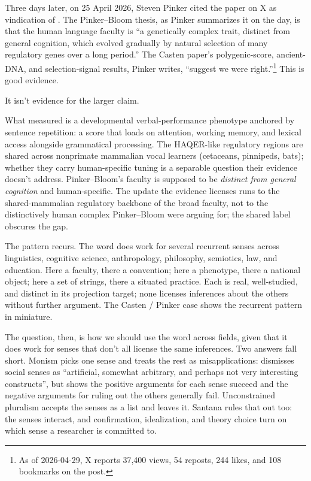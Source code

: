 \documentclass[12pt]{article}
\begin{document}
Three days later, on 25 April 2026, Steven Pinker cited the paper on X \citep{pinker2026tweet} as vindication of \textcite{pinkerbloom1990}. The Pinker--Bloom thesis, as Pinker summarizes it on the day, is that the human language faculty is \enquote{a genetically complex trait, distinct from general cognition, which evolved gradually by natural selection of many regulatory genes over a long period.} The Casten paper's polygenic-score, ancient-DNA, and selection-signal results, Pinker writes, \enquote{suggest we were right.}\footnote{As of 2026-04-29, X reports 37,400 views, 54 reposts, 244 likes, and 108 bookmarks on the post.} This is good evidence.

It isn't evidence for the larger claim.

What \citeauthor{casten2026} measured is a developmental verbal-performance phenotype anchored by sentence repetition: a score that loads on attention, working memory, and lexical access alongside grammatical processing. The HAQER-like regulatory regions are shared across nonprimate mammalian vocal learners (cetaceans, pinnipeds, bats); whether they carry human-specific tuning is a separable question their evidence doesn't address. Pinker--Bloom's faculty is supposed to be \emph{distinct from general cognition} and human-specific. The update the evidence licenses runs to the shared-mammalian regulatory backbone of the broad faculty, not to the distinctively human complex Pinker--Bloom were arguing for; the shared label  obscures the gap.

The pattern recurs. The word  does work for several recurrent senses across linguistics, cognitive science, anthropology, philosophy, semiotics, law, and education. Here a faculty, there a convention; here a phenotype, there a national object; here a set of strings, there a situated practice. Each is real, well-studied, and distinct in its projection target; none licenses inferences about the others without further argument. The Casten / Pinker case shows the recurrent pattern in miniature.

The question, then, is how we should use the word  across fields, given that it does work for senses that don't all license the same inferences. Two answers fall short. Monism picks one sense and treats the rest as misapplications: \textcite[26]{Chomsky1986} dismisses social senses as \enquote{artificial, somewhat arbitrary, and perhaps not very interesting constructs}, but \textcite{santana2016language} shows the positive arguments for each sense succeed and the negative arguments for ruling out the others generally fail. Unconstrained pluralism accepts the senses as a list and leaves it. Santana rules that out too: the senses interact, and confirmation, idealization, and theory choice turn on which sense a researcher is committed to.
\end{document}
